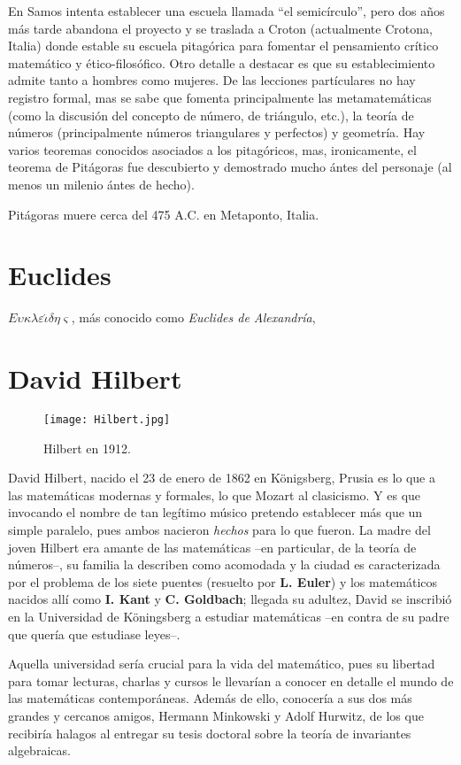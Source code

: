 \documentclass[11pt,a4paper]{book}
\begin{document}
En Samos intenta establecer una escuela llamada ``el semicírculo'', pero dos años más tarde abandona el proyecto y se traslada a Croton (actualmente Crotona, Italia) donde estable su escuela pitagórica para fomentar el pensamiento crítico matemático y ético-filosófico. Otro detalle a destacar es que su establecimiento admite tanto a hombres como mujeres. De las lecciones partículares no hay registro formal, mas se sabe que fomenta principalmente las metamatemáticas (como la discusión del concepto de número, de triángulo, etc.), la teoría de números (principalmente números triangulares y perfectos) y geometría. Hay varios teoremas conocidos asociados a los pitagóricos, mas, ironicamente, el teorema de Pitágoras fue descubierto y demostrado mucho ántes del personaje (al menos un milenio ántes de hecho).

Pitágoras muere cerca del 475 A.C. en Metaponto, Italia.

\section{Euclides}
$E\upsilon\kappa\lambda\varepsilon\acute{\iota}\delta\eta\varsigma$, más conocido como \textit{Euclides de Alexandría}, 

\section{David Hilbert}
\begin{wrapfigure}{R}{.3\textwidth}
\centering
\texttt{[image: Hilbert.jpg]}
\caption{Hilbert en 1912.}
\end{wrapfigure}

David Hilbert, nacido el 23 de enero de 1862 en Königsberg, Prusia es lo que a las matemáticas modernas y formales, lo que Mozart al clasicismo. Y es que invocando el nombre de tan legítimo músico pretendo establecer más que un simple paralelo, pues ambos nacieron \textit{hechos} para lo que fueron. La madre del joven Hilbert era amante de las matemáticas --en particular, de la teoría de números--, su familia la describen como acomodada y la ciudad es caracterizada por el problema de los siete puentes (resuelto por \textbf{L. Euler}) y los matemáticos nacidos allí como \textbf{I. Kant} y \textbf{C. Goldbach}; llegada su adultez, David se inscribió en la Universidad de Köningsberg a estudiar matemáticas --en contra de su padre que quería que estudiase leyes--.

Aquella universidad sería crucial para la vida del matemático, pues su libertad para tomar lecturas, charlas y cursos le llevarían a conocer en detalle el mundo de las matemáticas contemporáneas. Además de ello, conocería a sus dos más grandes y cercanos amigos, Hermann Minkowski y Adolf Hurwitz, de los que recibiría halagos al entregar su tesis doctoral sobre la teoría de invariantes algebraicas.
\end{document}
